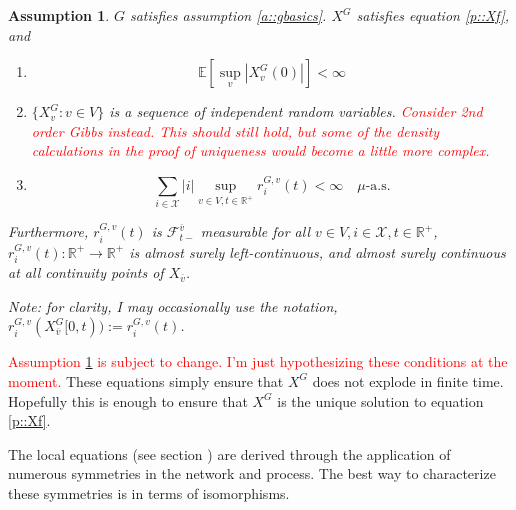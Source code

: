 \documentclass[12pt]{article}
\newcommand{\skipLine}{\vspace{12pt}}
\newcommand{\mb}{\mathbb}
\newcommand{\mc}{\mathcal}
\newcommand{\ra}{\rightarrow}
\newcommand{\ov}{\overline}
\newcommand{\te}{\text}
\newcommand{\tr}{\textcolor{red}}
\newcommand{\ind}{\hspace{24pt}}
\newcommand{\ex}[1]{\mb{E}\left[#1\right]}			%
\newcommand{\defeq}{:=}								%
\newcommand{\sta}{\mc{X}}							%
\newcommand{\cl}[1]{\ov{#1}}						%
\newcommand{\Xf}{X}									%
\newcommand{\rate}{r}								%
\newcommand{\F}{\mc{F}}								%
\newcommand{\m}{\mu}								%
\newcommand{\vind}[1]{_{#1}}						%
\newcommand{\tme}[1]{(#1)}							%
\newcommand{\tmi}[1]{#1}							%
\newcommand{\gind}[1]{^{#1}}						%
\newcommand{\vpara}[1]{^{#1}}						%
\newcommand{\stpara}[1]{_{#1}}						%
\newcommand{\tpara}[1]{_{#1}}						%
\newcommand{\gvpara}[2]{^{#1,#2}}					%
\newtheorem{assu}[thms]{Assumption}
\begin{document}
\begin{assu}
\(G\) satisfies assumption \ref{a::gbasics}. \(\Xf\gind{G}\) satisfies equation \eqref{p::Xf}, and 
\begin{enumerate}
\item 

\begin{equation}
\ex{\sup_v |\Xf\gind{G}\vind{v}\tme{0}|} < \infty
\label{a::bddstart}
\end{equation}

\item \(\{\Xf\gind{G}\vind{v}:v \in V\}\) is a sequence of independent random variables. \tr{Consider 2nd order Gibbs instead. This should still hold, but some of the density calculations in the proof of uniqueness would become a little more complex.}

\item

\begin{equation}
\sum_{i \in \sta}|i|\sup_{v \in V,t \in \mb{R}^+} \rate\gvpara{G}{v}\stpara{i}\tme{t} < \infty \quad \m\te{-a.s.}
\label{a::bddjmp}
\end{equation}
\end{enumerate}

Furthermore, \(\rate\gvpara{G}{v}\stpara{i}\tme{t}\) is \(\F\vpara{\cl{v}}\tpara{t-}\) measurable for all \(v\in V,i \in \sta, t \in \mb{R}^+\), \(\rate\gvpara{G}{v}\stpara{i}\tme{t}: \mb{R}^+ \ra \mb{R}^+\) is almost surely left-continuous, and almost surely continuous at all continuity points of \(\Xf\vind{\cl{v}}\).

\skipLine

Note: for clarity, I may occasionally use the notation, \(\rate\gvpara{G}{v}\stpara{i}(\Xf\gind{G}\vind{\cl{v}}\tmi{[0,t)}) \defeq \rate\gvpara{G}{v}\stpara{i}\tme{t}\).

\label{a::pbasics}
\end{assu}

\tr{Assumption \ref{a::pbasics} is subject to change. I'm just hypothesizing these conditions at the moment.} These equations simply ensure that \(\Xf\gind{G}\) does not explode in finite time. Hopefully this is enough to ensure that \(\Xf\gind{G}\) is the unique solution to equation \eqref{p::Xf}.

\ind The local equations (see section \iffalse\ref{}\fi) are derived through the application of numerous symmetries in the network and process. The best way to characterize these symmetries is in terms of isomorphisms.
\end{document}
